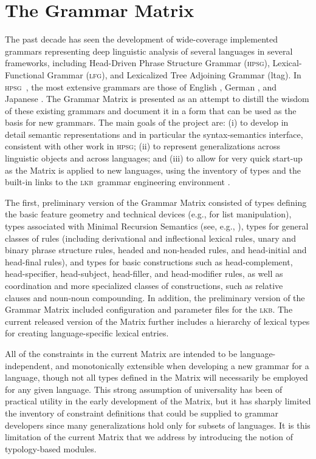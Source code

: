 \documentclass[11pt]{article}
\newcommand{\hpsg}{\textsc{hpsg}}
\newcommand{\lkb}{\textsc{lkb}}
\newcommand{\lfg}{\textsc{lfg}}
\begin{document}
\section{The Grammar Matrix}

The past decade has seen the development of wide-coverage implemented
grammars representing deep linguistic analysis of several languages in
several frameworks, including Head-Driven Phrase Structure Grammar
(\hpsg), Lexical-Functional Grammar (\lfg), and Lexicalized Tree
Adjoining Grammar ({\sc ltag}). In \hpsg\ \cite{Pol:Sag:94}, the most
extensive grammars are those of English \cite{Flickinger:00}, German
\cite{Mue:Kap:00}, and Japanese \cite{Siegel:00,Siegel:Bender:02}.
The Grammar Matrix \cite{Ben:Fli:Oe:02} is presented as 
an attempt to distill the
wisdom of these existing grammars and document it in a form that can
be used as the basis for new grammars. The main goals of the project
are: (i) to develop in detail semantic representations and in particular 
the syntax-semantics interface, consistent with other work in \hpsg; 
(ii) to represent generalizations across linguistic objects
and across languages; and (iii) to allow for very quick start-up as 
the Matrix is applied to new languages, using the inventory of types and
the built-in links to the \lkb\ grammar engineering environment
\cite{Copestake:02}.

The first, preliminary version of the Grammar Matrix 
consisted of types defining the basic feature geometry and technical
devices (e.g., for list manipulation), types associated with Minimal
Recursion Semantics (see, e.g., \cite{Cop:Las:Fli:01}), types for
general classes of rules (including derivational and inflectional
lexical rules, unary and binary phrase structure rules, headed and
non-headed rules, and head-initial and head-final rules), and types
for basic constructions such as head-complement, head-specifier,
head-subject, head-filler, and head-modifier rules, as well as 
coordination and more specialized classes of constructions, such as relative
clauses and noun-noun compounding.  In addition, the preliminary
version of the Grammar Matrix included configuration and parameter
files for the \lkb.  The current released version of the Matrix further 
includes a hierarchy of lexical types for creating language-specific 
lexical entries.

All of the constraints in the current Matrix are intended to be 
language-independent, and monotonically extensible when developing a
new grammar for a language, though not all types defined in the Matrix
will necessarily be employed for any given language.  This strong 
assumption of universality has been of practical utility in the early
development of the Matrix, but it has sharply limited the inventory of
constraint definitions that could be supplied to grammar developers
since many generalizations hold only for subsets of languages.  It is
this limitation of the current Matrix that we address by introducing
the notion of typology-based modules.
\end{document}
